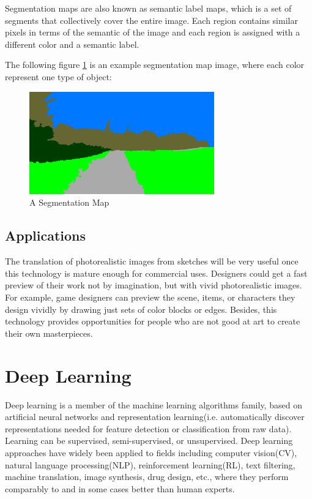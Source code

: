 Segmentation maps are also known as semantic label maps, which is a set of segments 
that collectively cover the entire image\cite{wikipedia}. Each region contains similar pixels 
in terms of the semantic of the image and each region is assigned with a different 
color and a semantic label.

The following figure \ref{fig:segmentation-map-example} is an example segmentation map image, where each color represent one type of object:
\begin{figure}[H]
    \begin{center}
    \includegraphics[width=8cm]{figures/seg-map-eg}
    \end{center}
    \caption{A Segmentation Map}
    \label{fig:segmentation-map-example}
\end{figure}

\subsection{Applications}
The translation of photorealistic images from sketches will be very useful once this technology
is mature enough for commercial uses. Designers could get a fast preview of 
their work not by imagination, but with vivid photorealistic images. For example, 
game designers can preview the scene, items, or characters they design vividly by drawing 
just sets of color blocks or edges. Besides, this technology provides opportunities for 
people who are not good at art to create their own masterpieces.


\section{Deep Learning}
\nocite{articleDL}
\nocite{Goodfellow-et-al-2016}
Deep learning is a member of the machine learning algorithms family, based on
artificial neural networks and representation learning\cite{wikipedia}(i.e. automatically discover 
representations needed for feature detection or classification from raw data). 
Learning can be supervised, semi-supervised, or unsupervised. Deep learning approaches have widely
been applied to fields including computer vision(CV), natural language processing(NLP), 
reinforcement learning(RL), text filtering, machine translation, image synthesis, drug design, etc., 
where they perform comparably to and in some cases better than human experts.  

